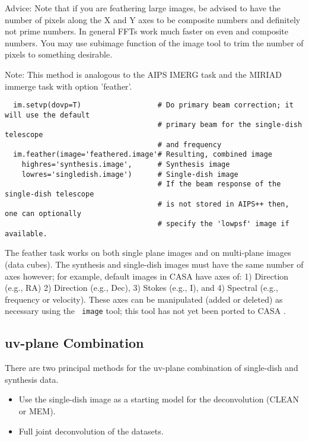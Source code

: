 Advice: Note that if you are feathering large images, be advised to
have the number of pixels along the X and Y axes to be composite
numbers and definitely not prime numbers. In general FFTs work much
faster on even and composite numbers. You may use subimage function of
the image tool to trim the number of pixels to something desirable.

Note: This method is analogous to the AIPS IMERG task and the MIRIAD
immerge task with option 'feather'.

\vspace{3mm}

\small
\begin{verbatim}
  im.setvp(dovp=T)                  # Do primary beam correction; it will use the default
                                    # primary beam for the single-dish telescope
                                    # and frequency
  im.feather(image='feathered.image'# Resulting, combined image
    highres='synthesis.image',      # Synthesis image
    lowres='singledish.image')      # Single-dish image
                                    # If the beam response of the single-dish telescope
                                    # is not stored in AIPS++ then, one can optionally
                                    # specify the 'lowpsf' image if  available.
\end{verbatim}
\normalsize

The feather task works on both single plane images and on multi-plane
images (data cubes).  The synthesis and single-dish images must have
the same number of axes however; for example, default images in CASA
have axes of: 1) Direction (e.g., RA) 2) Direction (e.g., Dec), 3)
Stokes (e.g., I), and 4) Spectral (e.g., frequency or velocity). These
axes can be manipulated (added or deleted) as necessary using the {\tt
image} tool; this tool has not yet been ported to CASA .

\subsection{uv-plane Combination}
\label{section:imtool.SDcombo.uvCombo}

There are two principal methods for the uv-plane combination of
single-dish and synthesis data. 

\begin{itemize}
\item Use the single-dish image as a starting model for the
      deconvolution (CLEAN or MEM).
\item Full joint deconvolution of the datasets.
\end{itemize}

